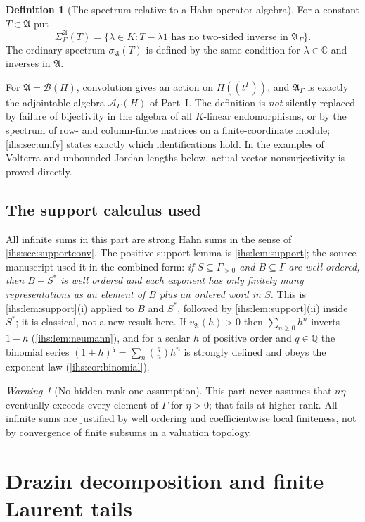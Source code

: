 \documentclass[11pt,a4paper]{article}
\numberwithin{equation}{section}
\theoremstyle{definition}
\newtheorem{definition}[definition]{Definition}
\theoremstyle{remark}
\newtheorem{warning}[warning]{Warning}
\newcommand{\C}{\mathbb C}
\newcommand{\Q}{\mathbb Q}
\newcommand{\K}{K}
\newcommand{\B}{\mathcal B(H)}
\newcommand{\Ahh}{\mathcal A_\Gamma(H)}
\newcommand{\Alg}{\mathfrak A}
\newcommand{\AlgG}{\mathfrak A_\Gamma}
\newcommand{\SigA}{\Sigma^{\Alg}_\Gamma}
\begin{document}
\begin{definition}[The spectrum relative to a Hahn operator algebra]\label{ihs:dz:def:spectrum}
For a constant $T\in\Alg$ put
\[
 \SigA(T)=\{\lambda\in\K:T-\lambda1\text{ has no two-sided inverse in }\AlgG\}.
\]
The ordinary spectrum $\sigma_\Alg(T)$ is defined by the same condition for
$\lambda\in\C$ and inverses in $\Alg$.
\end{definition}

For $\Alg=\B$, convolution gives an action on $H((t^\Gamma))$, and $\AlgG$
is exactly the adjointable algebra $\Ahh$ of Part~I. The definition is
\emph{not} silently replaced by failure of bijectivity in the algebra of all
$\K$-linear endomorphisms, or by the spectrum of row- and column-finite
matrices on a finite-coordinate module; \cref{ihs:sec:unify} states exactly
which identifications hold. In the examples of Volterra and unbounded Jordan
lengths below, actual vector nonsurjectivity is proved directly.

\subsection{The support calculus used}\label{ihs:dz:sec:support}
All infinite sums in this part are strong Hahn sums in the sense of
\cref{ihs:sec:supportconv}. The positive-support lemma is
\cref{ihs:lem:support}; the source manuscript used it in the combined form:
\emph{if $S\subseteq\Gamma_{>0}$ and $B\subseteq\Gamma$ are well ordered,
then $B+S^*$ is well ordered and each exponent has only finitely many
representations as an element of $B$ plus an ordered word in $S$.} This is
\cref{ihs:lem:support}(i) applied to $B$ and $S^*$, followed by
\cref{ihs:lem:support}(ii) inside $S^*$; it is classical, not a new result
here. If $v_\Alg(h)>0$ then $\sum_{n\ge0}h^n$ inverts $1-h$
(\cref{ihs:lem:neumann}), and for a scalar $h$ of positive order and
$q\in\Q$ the binomial series $(1+h)^q=\sum_n\binom qnh^n$ is strongly defined
and obeys the exponent law (\cref{ihs:cor:binomial}).

\begin{warning}[No hidden rank-one assumption]\label{ihs:dz:warn:rank}
This part never assumes that $n\eta$ eventually exceeds every element of
$\Gamma$ for $\eta>0$; that fails at higher rank. All infinite sums are
justified by well ordering and coefficientwise local finiteness, not by
convergence of finite subsums in a valuation topology.
\end{warning}

\section{Drazin decomposition and finite Laurent tails}\label{ihs:dz:sec:laurent}
\end{document}
